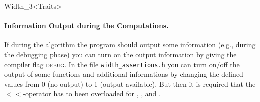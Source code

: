 \begin{ccRefClass}{Width_3<Traits>}
\begin{ccAdvanced}
\paragraph{Information Output during the Computations.} 

If during the algorithm the program should output some information
(e.g., during the debugging phase) you can turn on the output
information by giving the compiler flag \textsc{debug}. In the file
\texttt{width\_assertions.h} you can turn on/off the output of some
functions and additional informations by changing the defined values
from 0 (no output) to 1 (output available). But then it is required
that the $<\!<$-operator has to been overloaded for ,
,  and .

\end{ccAdvanced}

\ccExample
{}



\ccRestoreThreeColumns

\end{ccRefClass}


